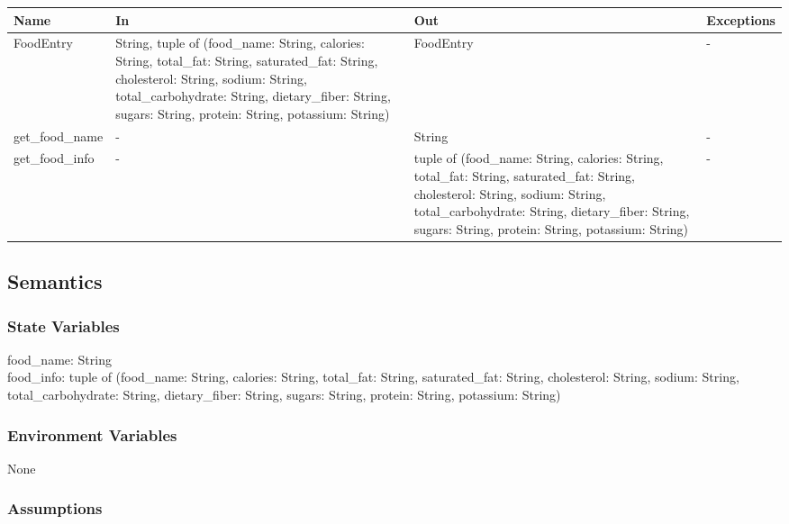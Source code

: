 \documentclass[12pt, titlepage]{article}
\begin{document}
\begin{center}
	\begin{tabular}{p{3cm} p{5cm} p{5cm} p{2cm}}
		\hline
		\textbf{Name} & \textbf{In} & \textbf{Out} & \textbf{Exceptions} \\
		\hline
		FoodEntry & String, tuple of (food\_name: String, calories: String, total\_fat: String, saturated\_fat: String, cholesterol: String, sodium: String, total\_carbohydrate: String, dietary\_fiber: String, sugars: String, protein: String, potassium: String) & FoodEntry & - \\
		get\_food\_name & - & String & - \\
		get\_food\_info & - & tuple of (food\_name: String, calories: String, total\_fat: String, saturated\_fat: String, cholesterol: String, sodium: String, total\_carbohydrate: String, dietary\_fiber: String, sugars: String, protein: String, potassium: String) & - \\
		\hline
	\end{tabular}
\end{center}

\subsection{Semantics}

\subsubsection{State Variables}
food\_name: String\\
food\_info: tuple of (food\_name: String, calories: String, total\_fat: String, saturated\_fat: String, cholesterol: String, sodium: String, total\_carbohydrate: String, dietary\_fiber: String, sugars: String, protein: String, potassium: String)


\subsubsection{Environment Variables}

None


\subsubsection{Assumptions}
\end{document}
